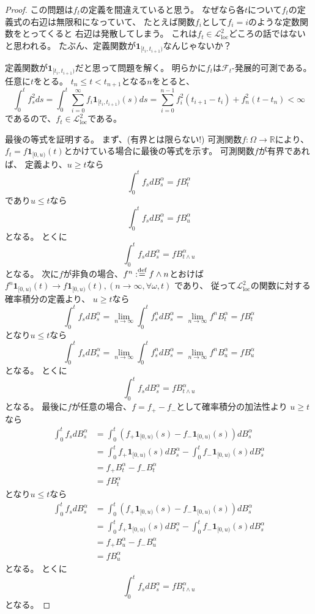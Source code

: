 \documentclass[uplatex]{jsarticle}
\theoremstyle{definition}
\def\R{\mathbb{R}}
\def\I{\mathbf{1}}
\def\mcF{\mathcal{F}}
\def\mcL{\mathcal{L}}
\def\dfn{:\overset{\mbox{{\scriptsize def}}}{=}}
\begin{document}
\begin{proof}
  この問題は\(f_t\)の定義を間違えていると思う。
  なぜなら各\(t\)について\(f_t\)の定義式の右辺は無限和になっていて、
  たとえば関数\(f_i\)として\(f_i = i\)のような定数関数をとってくると
  右辺は発散してしまう。
  これは\(f_t\in \mcL_{\mathrm{loc}}^2\)どころの話ではないと思われる。
  たぶん、定義関数が\(\I_{[t_i,t_{i+1})}\)なんじゃないか？

  定義関数が\(\I_{[t_i,t_{i+1})}\)だと思って問題を解く。
  明らかに\(f_t\)は\(\mcF_t\)-発展的可測である。
  任意に\(t\)をとる。
  \(t_n \leq t < t_{n+1}\)となる\(n\)をとると、
  \[
  \int_0^tf_s^2ds
  = \int_0^t \sum_{i=0}^\infty f_i\I_{[t_i,t_{i+1})}(s)ds
  = \sum_{i=0}^{n-1} f_i^2(t_{i+1}-t_i) + f_n^2(t-t_n) < \infty
  \]
  であるので、\(f_t\in \mcL_{\mathrm{loc}}^2\)である。

  最後の等式を証明する。
  まず、(有界とは限らない!) 可測関数\(f:\Omega\to \R\)により、
  \(f_t = f\I_{[0,u)}(t)\)とかけている場合に最後の等式を示す。
  可測関数\(f\)が有界であれば、
  定義より、\(u\geq t\)なら
  \[
  \int_0^t f_sdB_s^\alpha = f B_t^\alpha
  \]
  であり\(u \leq t\)なら
  \[
  \int_0^t f_sdB_s^\alpha = f B_u^\alpha
  \]
  となる。
  とくに
  \[
  \int_0^t f_sdB_s^\alpha = f B_{t\wedge u}^\alpha
  \]
  となる。
  次に\(f\)が非負の場合、\(f^n \dfn f\wedge n\)とおけば
  \(f^n\I_{[0,u)}(t) \to f\I_{[0,u)}(t), (n\to \infty, \forall \omega,t)\)
  であり、
  従って\(\mcL_{\mathrm{loc}}^2\)の関数に対する確率積分の定義より、
  \(u\geq t\)なら
  \[
  \int_0^t f_sdB_s^\alpha
  = \lim_{n\to \infty}\int_0^tf_s^n dB_s^\alpha
  = \lim_{n\to \infty}f^nB_t^\alpha
  = f B_t^\alpha
  \]
  となり\(u \leq t\)なら
  \[
  \int_0^t f_sdB_s^\alpha
  = \lim_{n\to \infty}\int_0^tf_s^n dB_s^\alpha
  = \lim_{n\to \infty}f^nB_u^\alpha
  = f B_u^\alpha
  \]
  となる。
  とくに
  \[
  \int_0^t f_sdB_s^\alpha = f B_{t\wedge u}^\alpha
  \]
  となる。
  最後に\(f\)が任意の場合、\(f=f_+-f_-\)として確率積分の加法性より
  \(u \geq t\)なら
  \begin{align*}
    \int_0^t f_sdB_s^\alpha
    &= \int_0^t(f_+\I_{[0,u)}(s)-f_-\I_{[0,u)}(s))dB_s^\alpha \\
    &= \int_0^tf_+\I_{[0,u)}(s)dB_s^\alpha - \int_0^tf_-\I_{[0,u)}(s)dB_s^\alpha \\
    &= f_+B_t^\alpha - f_-B_t^\alpha \\
    &= fB_t^\alpha
  \end{align*}
  となり\(u \leq t\)なら
  \begin{align*}
    \int_0^t f_sdB_s^\alpha
    &= \int_0^t(f_+\I_{[0,u)}(s)-f_-\I_{[0,u)}(s))dB_s^\alpha \\
    &= \int_0^tf_+\I_{[0,u)}(s)dB_s^\alpha - \int_0^tf_-\I_{[0,u)}(s)dB_s^\alpha \\
    &= f_+B_u^\alpha - f_-B_u^\alpha \\
    &= fB_u^\alpha
  \end{align*}
  となる。
  とくに
  \[
  \int_0^t f_sdB_s^\alpha = fB_{t\wedge u}^\alpha
  \]
  となる。


\end{proof}
\end{document}
